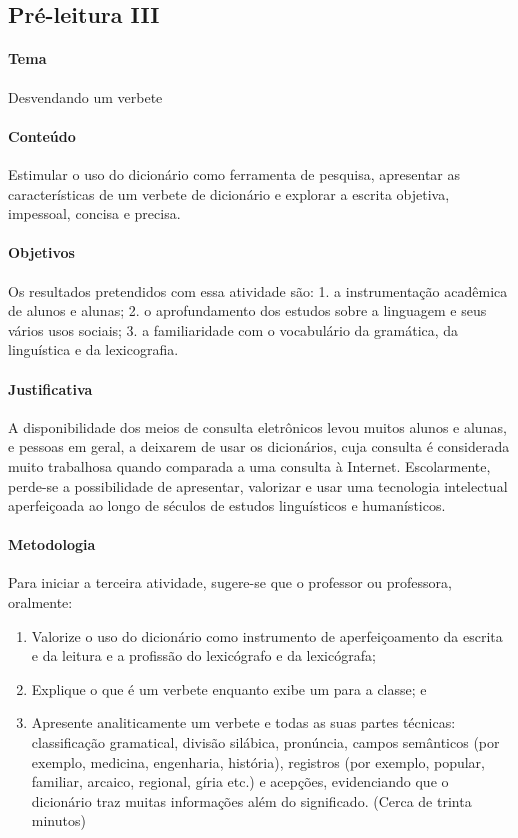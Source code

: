 \documentclass[12pt]{extarticle}
\begin{document}
\subsection{Pré-leitura III}

\paragraph{Tema} Desvendando um verbete 


\paragraph{Conteúdo} Estimular o uso do dicionário como ferramenta de pesquisa, apresentar as características de um verbete de dicionário e explorar a escrita objetiva, impessoal, concisa e precisa.


\paragraph{Objetivos}
Os resultados pretendidos com essa atividade são: 1. a instrumentação
acadêmica de alunos e alunas; 2. o aprofundamento dos estudos sobre a
linguagem e seus vários usos sociais; 3. a familiaridade com o
vocabulário da gramática, da linguística e da lexicografia.

\paragraph{Justificativa}
A disponibilidade dos meios de consulta eletrônicos levou muitos alunos
e alunas, e pessoas em geral, a deixarem de usar os dicionários, cuja
consulta é considerada muito trabalhosa quando comparada a uma consulta
à Internet. Escolarmente, perde-se a possibilidade de apresentar,
valorizar e usar uma tecnologia intelectual aperfeiçoada ao longo de
séculos de estudos linguísticos e humanísticos.

\paragraph{Metodologia}
Para iniciar a terceira atividade, sugere-se que o professor ou
professora, oralmente:

\begin{enumerate}
\item
Valorize o uso do dicionário como instrumento de aperfeiçoamento da
escrita e da leitura e a profissão do lexicógrafo e da lexicógrafa;

\item
Explique o que é um verbete enquanto exibe um para a classe; e

\item
Apresente analiticamente um verbete e todas as suas partes técnicas:
classificação gramatical, divisão silábica, pronúncia, campos semânticos
(por exemplo, medicina, engenharia, história), registros (por exemplo,
popular, familiar, arcaico, regional, gíria etc.) e acepções,
evidenciando que o dicionário traz muitas informações além do
significado. (Cerca de trinta minutos)
\end{enumerate}
\end{document}

